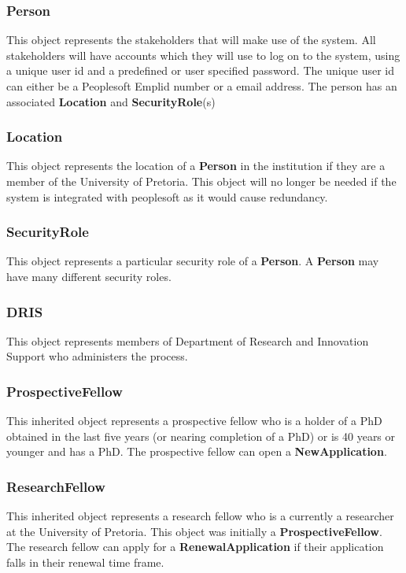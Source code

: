 \documentclass[12pt]{article}
\begin{document}
\newpage
\subsubsection{Person}
This object represents the stakeholders that will make use of the system. All stakeholders will have accounts which they will use to log on to the system, using a unique user id and a predefined or user specified password. The unique user id can either be a Peoplesoft Emplid number or a email address. The person has an associated \textbf{Location} and \textbf{SecurityRole}(s)

\subsubsection{Location}
This object represents the location of a \textbf{Person} in the institution if they are a member of the University of Pretoria. This object will no longer be needed if the system is integrated with peoplesoft as it would cause redundancy.

\subsubsection{SecurityRole}
This object represents a particular security role of a \textbf{Person}. A \textbf{Person} may have many different security roles.

\subsubsection{DRIS}
This object represents members of Department of Research and Innovation Support who administers the process.

\subsubsection{ProspectiveFellow}
This inherited object represents a prospective fellow who is a holder of a PhD obtained in the last five years (or nearing completion of a PhD) or is 40 years or younger and has a PhD. The prospective fellow can open a \textbf{NewApplication}.

\subsubsection{ResearchFellow}
This inherited object represents a research fellow who is a currently a researcher at the University of Pretoria. This object was initially a \textbf{ProspectiveFellow}. The research fellow can apply for a \textbf{RenewalApplication} if their application falls in their renewal time frame.
\end{document}

